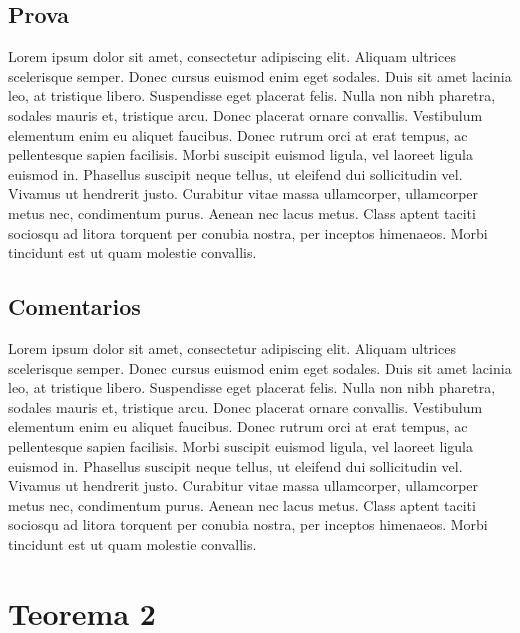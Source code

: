 \documentclass[twoside]{article}
\begin{document}
\begin{multicols}{2}
\subsection{ Prova }
\indent Lorem ipsum dolor sit amet, consectetur adipiscing elit. Aliquam ultrices scelerisque semper. Donec cursus euismod enim eget sodales. Duis sit amet lacinia leo, at tristique libero. Suspendisse eget placerat felis. Nulla non nibh pharetra, sodales mauris et, tristique arcu. Donec placerat ornare convallis. Vestibulum elementum enim eu aliquet faucibus. Donec rutrum orci at erat tempus, ac pellentesque sapien facilisis. Morbi suscipit euismod ligula, vel laoreet ligula euismod in. Phasellus suscipit neque tellus, ut eleifend dui sollicitudin vel. Vivamus ut hendrerit justo. Curabitur vitae massa ullamcorper, ullamcorper metus nec, condimentum purus. Aenean nec lacus metus. Class aptent taciti sociosqu ad litora torquent per conubia nostra, per inceptos himenaeos. Morbi tincidunt est ut quam molestie convallis.



\subsection{ Comentarios }
\indent Lorem ipsum dolor sit amet, consectetur adipiscing elit. Aliquam ultrices scelerisque semper. Donec cursus euismod enim eget sodales. Duis sit amet lacinia leo, at tristique libero. Suspendisse eget placerat felis. Nulla non nibh pharetra, sodales mauris et, tristique arcu. Donec placerat ornare convallis. Vestibulum elementum enim eu aliquet faucibus. Donec rutrum orci at erat tempus, ac pellentesque sapien facilisis. Morbi suscipit euismod ligula, vel laoreet ligula euismod in. Phasellus suscipit neque tellus, ut eleifend dui sollicitudin vel. Vivamus ut hendrerit justo. Curabitur vitae massa ullamcorper, ullamcorper metus nec, condimentum purus. Aenean nec lacus metus. Class aptent taciti sociosqu ad litora torquent per conubia nostra, per inceptos himenaeos. Morbi tincidunt est ut quam molestie convallis.



\section{Teorema 2}


\end{multicols}
\end{document}

